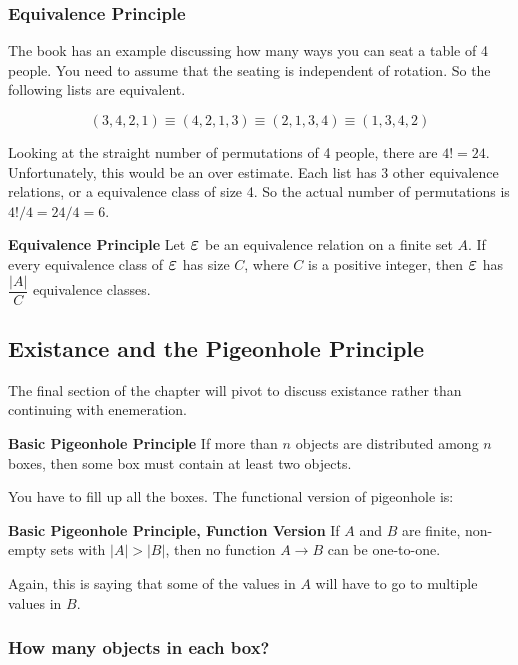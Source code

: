 \documentclass{article}
\begin{document}
\subsubsection{Equivalence Principle}
The book has an example discussing how many ways you can seat a table of 4 people. You need to assume that the seating is independent of rotation. So the following lists are equivalent.

\begin{equation*}
    (3, 4, 2, 1) \equiv (4, 2, 1, 3) \equiv (2, 1, 3, 4) \equiv (1, 3, 4, 2)
\end{equation*}

Looking at the straight number of permutations of 4 people, there are $4! = 24$. Unfortunately, this would be an over estimate. Each list has 3 other equivalence relations, or a equivalence class of size 4. So the actual number of permutations is $4!/4 = 24/4 = 6$.

\begin{thm}
\textbf{Equivalence Principle} Let $\veps$ be an equivalence relation on a finite set $A$. If every equivalence class of $\veps$ has size $C$, where $C$ is a positive integer, then $\veps$ has $\dfrac{|A|}{C}$ equivalence classes.
\end{thm}

\subsection{Existance and the Pigeonhole Principle}
The final section of the chapter will pivot to discuss existance rather than continuing with enemeration.

\begin{thm}
\textbf{Basic Pigeonhole Principle} If more than $n$ objects are distributed among $n$ boxes, then some box must contain at least two objects.
\end{thm}

You have to fill up all the boxes. The functional version of pigeonhole is:

\begin{thm}
\textbf{Basic Pigeonhole Principle, Function Version} If $A$ and $B$ are finite, non-empty sets with $|A| > |B|$, then no function $A \rightarrow B$ can be one-to-one.
\end{thm}

Again, this is saying that some of the values in $A$ will have to go to multiple values in $B$.

\subsubsection{How many objects in each box?}
\end{document}
